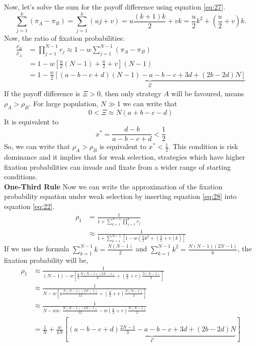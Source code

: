 \documentclass{article}
\begin{document}
Now, let's solve the sum for the payoff difference using equation \eqref{eq:27}.
\begin{equation}
\sum_{j=1}^{k} (\pi_A - \pi_B) = \sum_{j=1}^{k} (u j + v) = u \frac{(k+1)k}{2} + vk = \frac{u}{2}k^2 +( \frac{u}{2} + v)k. \label{eq:28}
\end{equation}
Now, the ratio of fixation probabilities:
\begin{align}
\frac{\rho_B}{\rho_A} &= \prod_{j=1}^{N-1}r_j \approx 1 - w \sum_{j=1}^{N-1} (\pi_A - \pi_B)\nonumber\\
&= 1 - w[ \frac{u}{2}(N-1) + \frac{u}{2} + v](N-1) \nonumber\\
&= 1 - \frac{w}{2} \underbrace{[(a - b - c + d)(N - 1) - a - b - c + 3d + (2b - 2d)N]}_{\Xi} \label{eq:29}
\end{align}
If the payoff difference is $\Xi > 0$, then only strategy $A$ will be favoured, means $\rho_A>\rho_B$.
For large population, $N \gg 1$ we can write that
\begin{equation}
0<\Xi \approx N(a+b-c-d)\label{eq:30}
\end{equation}
It is equivalent to
\begin{equation}
x^*=\frac{d-b}{a-b-c+d}<\frac{1}{2} \label{eq:31}
\end{equation}
So, we can write that $\rho_A >\rho_B$ is equivalent to $x^*<\frac{1}{2}$.
This condition is risk dominance and it implies that for weak selection, strategies which have higher fixation probabilities can invade and fixate from a wider range of starting conditions.\\
\textbf{One-Third Rule}
\newline
Now we can write the approximation of the fixation probability equation under weak selection by inserting equation \eqref{eq:28} into equation \eqref{eq:22}.
\begin{align}
\rho_1 &= \frac{1}{1+\sum_{k=1}^{N-1} \prod_{j=1}^{k}r_j}\nonumber\\
&\approx \frac{1}{1+\sum_{k=1}^{N-1}[1-w(\frac{u}{2}k^2+(\frac{u}{2}+v)k)]} \label{eq:32}
\end{align}
If we use the formula $\sum_{k=1}^{N-1} k = \frac{N(N - 1)}{2}$ and $\sum_{k=1}^{N-1} k^2 = \frac{N(N - 1)(2N - 1)}{6}$, the fixation probability will be,
\begin{align}
\rho_1 &\approx\frac{1}{(N - 1)- w [\frac{u}{2}\frac{N(N - 1)(2N - 1)}{6} + (\frac{u}{2} + v)\frac{N(N - 1)}{2}]}\nonumber\\
&\approx \frac{1}{N - w[ u \frac{N(N - 1)(2N - 1)}{12} + ( \frac{u}{2} + v)\frac{N(N - 1)}{2}]}\nonumber\\
&\approx \frac{1}{N - wu \cdot \frac{N(N - 1)(2N - 1)}{12} - w ( \frac{u}{2} + v)\frac{N(N - 1)}{2}} \nonumber\\
&= \frac{1}{N} + \frac{w}{4N}[\underbrace{( a - b - c + d)\frac{2N - 1}{3} - a - b - c + 3d + (2b - 2d)N
}_{\Gamma}] \label{eq:33}
\end{align}
\end{document}
